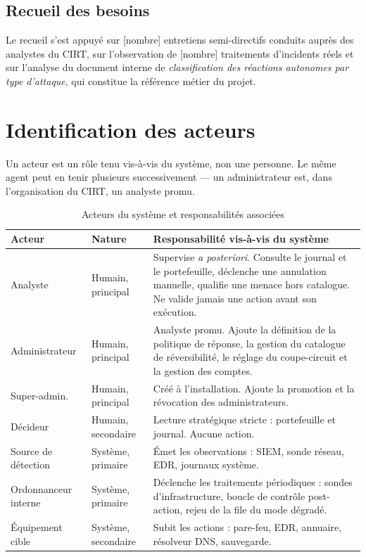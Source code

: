 \subsection{Recueil des besoins}
Le recueil s'est appuy\'e sur [nombre] entretiens semi-directifs conduits aupr\`es
des analystes du CIRT, sur l'observation de [nombre] traitements d'incidents
r\'eels et sur l'analyse du document interne de \emph{classification des r\'eactions
autonomes par type d'attaque}, qui constitue la r\'ef\'erence m\'etier du projet.

\section{Identification des acteurs}
Un acteur est un r\^ole tenu vis-\`a-vis du syst\`eme, non une personne. Le m\^eme agent
peut en tenir plusieurs successivement --- un administrateur est, dans
l'organisation du CIRT, un analyste promu.

\begin{table}[H]
\centering
\caption{Acteurs du syst\`eme et responsabilit\'es associ\'ees}
\label{tab:acteurs}
\small
\begin{tabular}{@{}p{2.6cm}p{2.2cm}p{8.5cm}@{}}
\toprule
\textbf{Acteur} & \textbf{Nature} & \textbf{Responsabilit\'e vis-\`a-vis du syst\`eme} \\
\midrule
Analyste & Humain, principal &
  Supervise \emph{a posteriori}. Consulte le journal et le portefeuille, d\'eclenche
  une annulation manuelle, qualifie une menace hors catalogue. Ne valide jamais
  une action avant son ex\'ecution. \\
Administrateur & Humain, principal &
  Analyste promu. Ajoute la d\'efinition de la politique de r\'eponse, la gestion du
  catalogue de r\'eversibilit\'e, le r\'eglage du coupe-circuit et la gestion des comptes. \\
Super-admin. & Humain, principal &
  Cr\'e\'e \`a l'installation. Ajoute la promotion et la r\'evocation des administrateurs. \\
D\'ecideur & Humain, secondaire &
  Lecture strat\'egique stricte : portefeuille et journal. Aucune action. \\
Source de d\'etection & Syst\`eme, primaire &
  \'Emet les observations : SIEM, sonde r\'eseau, EDR, journaux syst\`eme. \\
Ordonnanceur interne & Syst\`eme, primaire &
  D\'eclenche les traitements p\'eriodiques : sondes d'infrastructure, boucle de
  contr\^ole post-action, rejeu de la file du mode d\'egrad\'e. \\
\'Equipement cible & Syst\`eme, secondaire &
  Subit les actions : pare-feu, EDR, annuaire, r\'esolveur DNS, sauvegarde. \\
\bottomrule
\end{tabular}
\end{table}

